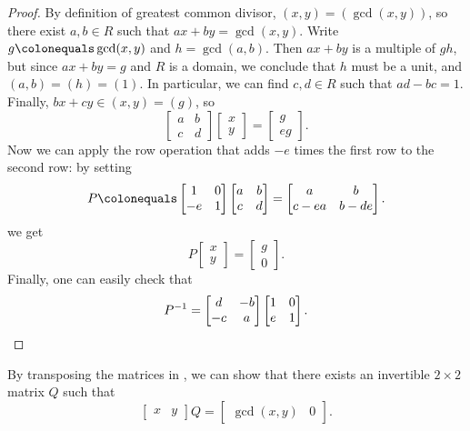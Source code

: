\documentclass[12pt]{report}
\numberwithin{equation}{section}
\numberwithin{theorem}{chapter}
\theoremstyle{definition}
\newtheorem*{basic properties}{Basic Properties}
\newtheorem*{Important Remark}{Important Remark}
\begin{document}
\begin{proof}
	By definition of greatest common divisor, $(x,y) = (\gcd(x,y))$, so there exist $a, b \in R$ such that $ax+by = \gcd(x,y)$. Write $g \colonequals \gcd(x,y)$ and $h = \gcd(a,b)$. Then $ax+by$ is a multiple of $gh$, but since $ax+by = g$ and $R$ is a domain, we conclude that $h$ must be a unit, and $(a,b) = (h) = (1)$. In particular, we can find $c, d \in R$ such that $ad-bc = 1$. Finally, $bx+cy \in (x,y) = (g)$, so 
	$$\begin{bmatrix} a & b \\ c & d \end{bmatrix} \begin{bmatrix} x \\ y\end{bmatrix} = \begin{bmatrix} g \\ eg \end{bmatrix}.$$
	Now we can apply the row operation that adds $-e$ times the first row to the second row: by setting
	$$P \colonequals \begin{bmatrix} 1 & 0 \\ -e & 1 \end{bmatrix} \begin{bmatrix} a & b \\ c & d \end{bmatrix} = \begin{bmatrix} a & b \\ c-ea & b-de \end{bmatrix}.$$
	we get
	$$P \begin{bmatrix} x \\ y\end{bmatrix} = \begin{bmatrix} g \\ 0 \end{bmatrix}.$$
	Finally, one can easily check that
	$$P^{-1} = \begin{bmatrix} d & -b \\ -c & a \end{bmatrix}  \begin{bmatrix} 1 & 0 \\ e & 1 \end{bmatrix}.\qedhere$$
\end{proof}


By transposing the matrices in , we can show that there exists an invertible $2 \times 2$ matrix $Q$ such that
$$\begin{bmatrix} x & y\end{bmatrix} Q = \begin{bmatrix} \gcd(x,y) & 0 \end{bmatrix}.$$
\end{document}
